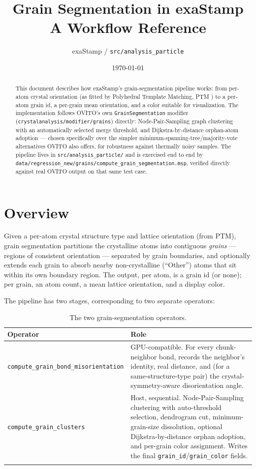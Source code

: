 \documentclass[11pt,a4paper]{article}
\title{Grain Segmentation in exaStamp\\
\large A Workflow Reference}
\author{exaStamp / \texttt{src/analysis\_particle}}
\date{\today}
\newcommand{\op}[1]{\texttt{#1}}
\newcommand{\field}[1]{\texttt{#1}}
\newcommand{\code}[1]{\texttt{#1}}
\begin{document}
\maketitle

\begin{abstract}
This document describes how exaStamp's grain-segmentation pipeline works: from per-atom crystal
orientation (as fitted by Polyhedral Template Matching, PTM \cite{ptm2016}) to a per-atom grain id,
a per-grain mean orientation, and a color suitable for visualization. The implementation follows
OVITO's own \code{GrainSegmentation} modifier (\code{crystalanalysis/modifier/grains}) directly:
Node-Pair-Sampling graph clustering with an automatically selected merge threshold, and
Dijkstra-by-distance orphan-atom adoption — chosen specifically over the simpler
minimum-spanning-tree/majority-vote alternatives OVITO also offers, for robustness against
thermally noisy samples. The pipeline lives in \texttt{src/analysis\_particle/} and is exercised end to end by
\texttt{data/regression\_new/grains/compute\_grain\_segmentation.msp}, verified directly against
real OVITO output on that same test case.
\end{abstract}

\tableofcontents

\section{Overview}

Given a per-atom crystal structure type and lattice orientation (from PTM), grain segmentation
partitions the crystalline atoms into contiguous \emph{grains} — regions of consistent
orientation — separated by grain boundaries, and optionally extends each grain to absorb nearby
non-crystalline (``Other'') atoms that sit within its own boundary region. The output, per atom, is
a grain id (or none); per grain, an atom count, a mean lattice orientation, and a display color.

The pipeline has two stages, corresponding to two separate operators:

\begin{longtable}{@{}p{}p{}@{}}
\hline
\textbf{Operator} & \textbf{Role} \\
\hline
\op{compute\_grain\_bond\_misorientation} &
  GPU-compatible. For every chunk-neighbor bond, records the neighbor's identity, real distance,
  and (for a same-structure-type pair) the crystal-symmetry-aware disorientation angle. \\
\op{compute\_grain\_clusters} &
  Host, sequential. Node-Pair-Sampling clustering with auto-threshold selection, dendrogram cut,
  minimum-grain-size dissolution, optional Dijkstra-by-distance orphan adoption, and per-grain
  color assignment. Writes the final \field{grain\_id}/\field{grain\_color} fields. \\
\hline
\caption{The two grain-segmentation operators.}
\label{tab:pipeline}
\end{longtable}
\end{document}

